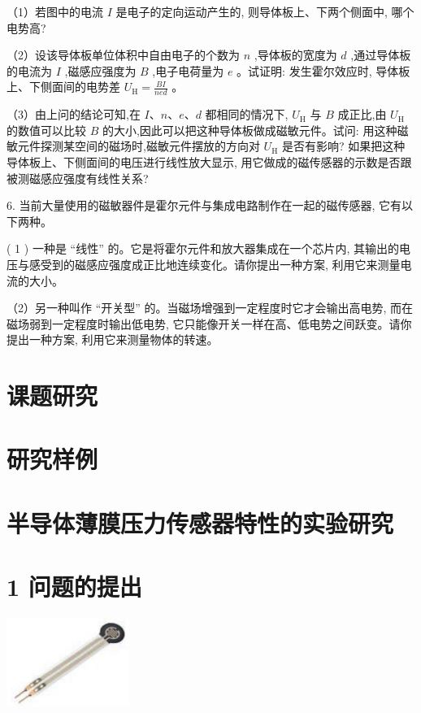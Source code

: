 \documentclass[10pt]{article}
\begin{document}
（1）若图中的电流 \(I\) 是电子的定向运动产生的, 则导体板上、下两个侧面中, 哪个电势高?

（2）设该导体板单位体积中自由电子的个数为 \(n\) ,导体板的宽度为 \(d\) ,通过导体板的电流为 \(I\) ,磁感应强度为 \(B\) ,电子电荷量为 \(e\) 。试证明: 发生霍尔效应时, 导体板上、下侧面间的电势差 \({U}_{\mathrm{H}} = \frac{BI}{ned}\) 。

（3）由上问的结论可知,在 \(I\text{、}n\text{、}e\text{、}d\) 都相同的情况下, \({U}_{\mathrm{H}}\) 与 \(B\) 成正比,由 \({U}_{\mathrm{H}}\) 的数值可以比较 \(B\) 的大小,因此可以把这种导体板做成磁敏元件。试问: 用这种磁敏元件探测某空间的磁场时,磁敏元件摆放的方向对 \({U}_{\mathrm{H}}\) 是否有影响? 如果把这种导体板上、下侧面间的电压进行线性放大显示, 用它做成的磁传感器的示数是否跟被测磁感应强度有线性关系?

6. 当前大量使用的磁敏器件是霍尔元件与集成电路制作在一起的磁传感器, 它有以下两种。

( 1 ) 一种是 “线性” 的。它是将霍尔元件和放大器集成在一个芯片内, 其输出的电压与感受到的磁感应强度成正比地连续变化。请你提出一种方案, 利用它来测量电流的大小。

（2）另一种叫作 “开关型” 的。当磁场增强到一定程度时它才会输出高电势, 而在磁场弱到一定程度时输出低电势, 它只能像开关一样在高、低电势之间跃变。请你提出一种方案, 利用它来测量物体的转速。

\section*{课题研究}

\section*{研究样例}

\section*{半导体薄膜压力传感器特性的实验研究}

\section*{1 问题的提出}

\begin{center}
\includegraphics[max width=0.3\textwidth]{images/01910e72-c5b7-7ed5-a6d4-fb3a5faefc32_116_581020.jpg}
\end{center}
\end{document}

